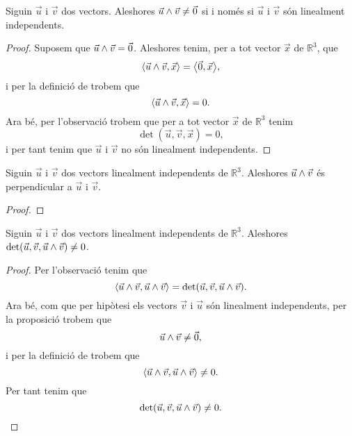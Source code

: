 \documentclass[../Apunts.tex]{subfiles}
\begin{document}
	\begin{proposition}
		\label{prop:el producte vectorial és zero si i només si els vectors no són linealment independents}
		Siguin \(\vec{u}\) i \(\vec{v}\) dos vectors. Aleshores \(\vec{u}\mathbin{\wedge}\vec{v}\neq\vec{0}\) si i només si \(\vec{u}\) i \(\vec{v}\) són linealment independents.
		\begin{proof}
			Suposem que \(\vec{u}\mathbin{\wedge}\vec{v}=\vec{0}\). Aleshores tenim, per a tot vector \(\vec{x}\) de \(\mathbb{R}^{3}\), que
			\[\prodesc{\vec{u}\prodvec\vec{v}}{\vec{x}}=\prodesc{\vec{0}}{\vec{x}},\]
			i per la definició de  trobem que
			\[\prodesc{\vec{u}\prodvec\vec{v}}{\vec{x}}=0.\]
			Ara bé, per l'observació  trobem que per a tot vector \(\vec{x}\) de \(\mathbb{R}^{3}\) tenim
			\[\det(\vec{u},\vec{v},\vec{x})=0,\]
			i per tant tenim que \(\vec{u}\) i \(\vec{v}\) no són linealment independents. %
		\end{proof}
	\end{proposition}
	\begin{proposition}
		\label{prop:dos vectors linealment independents són perpendiculars al seu producte vectorial}
		\label{prop:el producte vectorial és perpendicular als vectors}
		Siguin \(\vec{u}\) i \(\vec{v}\) dos vectors linealment independents de \(\mathbb{R}^{3}\). Aleshores \(\vec{u}\mathbin{\wedge}\vec{v}\) és perpendicular a \(\vec{u}\) i \(\vec{v}\).
		\begin{proof}
		\end{proof}
	\end{proposition}
	\begin{proposition}
		\label{prop:el determinant de dos vectors linealment independents i el seu producte vectorial és diferent de zero}
		Siguin \(\vec{u}\) i \(\vec{v}\) dos vectors linealment independents de \(\mathbb{R}^{3}\). Aleshores \(\det(\vec{u},\vec{v},\vec{u}\mathbin{\wedge}\vec{v})\neq0\).
		\begin{proof}
			Per l'observació  tenim que
			\[\prodesc{\vec{u}\prodvec\vec{v}}{\vec{u}\prodvec\vec{v}}=\det(\vec{u},\vec{v},\vec{u}\prodvec\vec{v}).\]
			Ara bé, com que per hipòtesi els vectors \(\vec{v}\) i \(\vec{u}\) són linealment independents, per la proposició  trobem que
			\[\vec{u}\mathbin{\wedge}\vec{v}\neq\vec{0},\]
			i per la definició de  trobem que
			\[\prodesc{\vec{u}\prodvec\vec{v}}{\vec{u}\prodvec\vec{v}}\neq0.\]
			Per tant tenim que
			\[\det(\vec{u},\vec{v},\vec{u}\mathbin{\wedge}\vec{v})\neq0.\qedhere\]
		\end{proof}
	\end{proposition}
\end{document}
